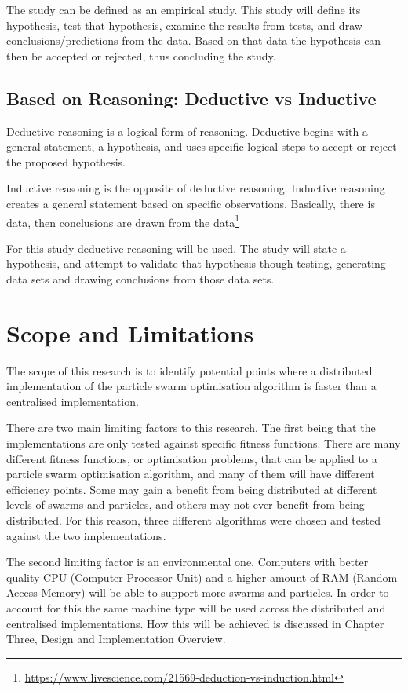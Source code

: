 \documentclass[oneside,12pt]{book}
\begin{document}
The study can be defined as an empirical study. This study will define its hypothesis, test that hypothesis, examine the results from tests, and draw conclusions/predictions from the data. Based on that data the hypothesis can then be accepted or rejected, thus concluding the study. 

\subsection{Based on Reasoning: Deductive vs Inductive}
Deductive reasoning is a logical form of reasoning. Deductive begins with a general statement, a hypothesis, and uses specific logical steps to accept or reject the proposed hypothesis.

Inductive reasoning is the opposite of deductive reasoning. Inductive reasoning creates a general statement based on specific observations. Basically, there is data, then conclusions are drawn from the data\footnote{\url{https://www.livescience.com/21569-deduction-vs-induction.html}}

For this study deductive reasoning will be used. The study will state a hypothesis, and attempt to validate that hypothesis though testing, generating data sets and drawing conclusions from those data sets. 

\section{Scope and Limitations}
The scope of this research is to identify potential points where a distributed implementation of the particle swarm optimisation algorithm is faster than a centralised implementation. 

There are two main limiting factors to this research. The first being that the implementations are only tested against specific fitness functions. There are many different fitness functions, or optimisation problems, that can be applied to a particle swarm optimisation algorithm, and many of them will have different efficiency points. Some may gain a benefit from being distributed at different levels of swarms and particles, and others may not ever benefit from being distributed. For this reason, three different algorithms were chosen and tested against the two implementations. 

The second limiting factor is an environmental one. Computers with better quality CPU (Computer Processor Unit) and a higher amount of RAM (Random Access Memory) will be able to support more swarms and particles. In order to account for this the same machine type will be used across the distributed and centralised implementations. How this will be achieved is discussed in Chapter Three, Design and Implementation Overview. 
\end{document}
